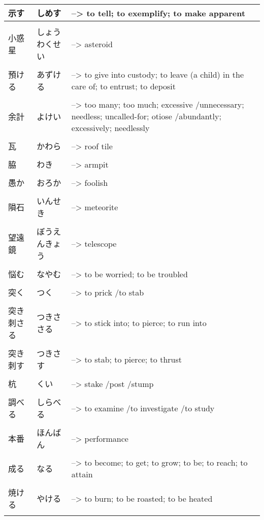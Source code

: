 \documentclass{article}
\begin{document}
\begin{tabular}{ l | l p{14cm}  }
示す & しめす &--> to tell; to exemplify; to make apparent \\ \hline\\[-1em]
小惑星 & しょうわくせい &--> asteroid \\ \hline\\[-1em]
預ける & あずける &--> to give into custody; to leave (a child) in the care of; to entrust; to deposit \\ \hline\\[-1em]
余計 & よけい &--> too many; too much; excessive /unnecessary; needless; uncalled-for; otiose /abundantly; excessively; needlessly \\ \hline\\[-1em]
瓦 & かわら &--> roof tile \\ \hline\\[-1em]
脇 & わき &--> armpit \\ \hline\\[-1em]
愚か & おろか &--> foolish \\ \hline\\[-1em]
隕石 & いんせき &--> meteorite \\ \hline\\[-1em]
望遠鏡 & ぼうえんきょう &--> telescope \\ \hline\\[-1em]
悩む & なやむ &--> to be worried; to be troubled \\ \hline\\[-1em]
突く & つく &--> to prick /to stab \\ \hline\\[-1em]
突き刺さる & つきささる &--> to stick into; to pierce; to run into \\ \hline\\[-1em]
突き刺す & つきさす &--> to stab; to pierce; to thrust \\ \hline\\[-1em]
杭 & くい &--> stake /post /stump \\ \hline\\[-1em]
調べる & しらべる &--> to examine /to investigate /to study \\ \hline\\[-1em]
本番 & ほんばん &--> performance \\ \hline\\[-1em]
成る & なる &--> to become; to get; to grow; to be; to reach; to attain \\ \hline\\[-1em]
焼ける & やける &--> to burn; to be roasted; to be heated \\ \hline\\[-1em]

\end{tabular}
\end{document}
